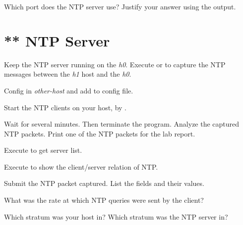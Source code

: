 \documentclass{../UTNetLab}
\begin{document}
\begin{report}
    \item Which port does the NTP server use?
    Justify your answer using the  output.
\end{report}

\section{** NTP Server}
Keep the NTP server running on the \textit{h0}.
Execute  or  to capture the NTP messages between the \textit{h1} host and the \textit{h0}.

Config  in \textit{other-host} and add  to config file.

Start the NTP clients on your host, by .

Wait for several minutes.
Then terminate the  program.
Analyze the captured NTP packets.
Print one of the NTP packets for the lab report.

Execute  to get  server list.

Execute  to show the client/server relation of NTP.

\begin{report}
    \item Submit the NTP packet captured.
    List the fields and their values.

    \item What was the rate at which NTP queries were sent by the client?

    \item Which stratum was your host in? Which stratum was the NTP server in?
\end{report}
\end{document}
